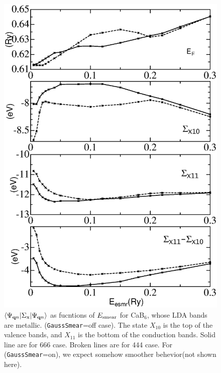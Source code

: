 \documentclass[a4paper,10pt,epsf,fleqn]{article}
\begin{document}
\begin{figure}
\includegraphics[width=15cm]{extest.eps}
\caption[]{$\langle \Psi_{{\bf q}n}|\Sigma_{\rm x} |\Psi_{{\bf q}n} \rangle$
as fucntions of $E_{\rm smear}$ for CaB$_6$, whose LDA bands are metallic.
({\tt GaussSmear}=off case).
The state $X_{10}$ is the top of the valence bands, and $X_{11}$ is the
bottom of the conduction bands. Solid line are for 666 case.
Broken lines are for 444 case. 
For ({\tt GaussSmear}=on), we expect somehow smoother behevior(not shown here). }
\label{extestcab6}
\end{figure}
\end{document}

